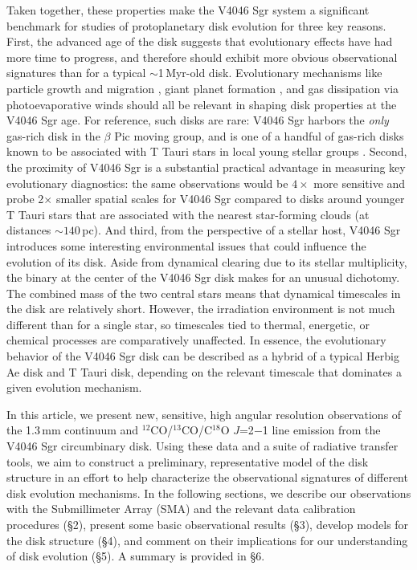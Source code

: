{Taken together, these properties make the V4046 Sgr system a significant 
benchmark for studies of protoplanetary disk evolution for three
key reasons.  First, the advanced age of the disk suggests that evolutionary
effects have had more time to progress, and therefore should exhibit more
obvious observational signatures than for a typical $\sim$1\,Myr-old disk.
Evolutionary mechanisms like particle growth and migration
\citep[e.g.,][]{birnstiel12a}, giant planet formation
\citep[e.g.,][]{pollack96,hubickyj05}, and gas dissipation via photoevaporative
winds \citep[e.g.,][]{clarke01,alexander09} should all be relevant in shaping
disk properties at the V4046 Sgr age.  For reference, such disks are rare: V4046
Sgr harbors the {\it only} gas-rich disk in the $\beta$ Pic moving group, and 
is one of a handful of gas-rich disks known to be associated with
T Tauri stars in local young stellar groups \citep[the others orbit TW Hya, MP 
Mus, and T Cha;][]{kastner97,kastner10,sacco13}.
Second, the proximity of 
V4046 Sgr is a substantial practical advantage in measuring key evolutionary 
diagnostics: the same observations would be $4\times$ more sensitive and probe 
2$\times$ smaller spatial scales for V4046 Sgr compared to disks around 
younger T Tauri stars that are associated with the nearest star-forming 
clouds (at distances $\sim 140$\,pc).  And third, from the perspective of a 
stellar host, V4046 Sgr introduces some interesting environmental issues that 
could influence the evolution of its disk.  Aside from dynamical clearing due to
its stellar multiplicity, the binary at the center of the V4046 Sgr disk makes 
for an unusual dichotomy.  The combined mass of the two central stars means that
dynamical timescales in the disk are relatively short.  However, the 
irradiation environment is not much different than for a single star, so 
timescales tied to thermal, energetic, or chemical processes are comparatively 
unaffected.  In essence, the evolutionary behavior of the V4046 Sgr disk can be 
described as a hybrid of a typical Herbig Ae disk and T Tauri disk, depending on
the relevant timescale that dominates a given evolution mechanism.

In this article, we present new, sensitive, high angular resolution observations
of the 1.3\,mm continuum and $^{12}$CO/$^{13}$CO/C$^{18}$O $J$=2$-$1 line 
emission from the V4046 Sgr circumbinary disk.  Using these data and a suite of 
radiative transfer tools, we aim to construct a preliminary, representative 
model of the disk structure in an effort to help characterize the observational 
signatures of different disk evolution mechanisms.  In the following sections, 
we describe our observations with the Submillimeter Array (SMA) and the relevant
data calibration procedures (\S 2), present some basic observational results 
(\S 3), develop models for the disk structure (\S 4), and comment on their 
implications for our understanding of disk evolution (\S 5).  A summary is 
provided in \S 6.


}
